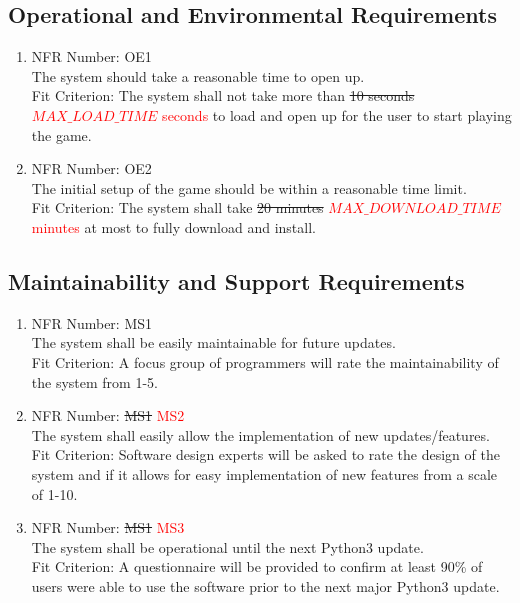 \documentclass[12pt, titlepage]{article}
\begin{document}
\subsection{Operational and Environmental Requirements}
\begin{enumerate} %
    \item NFR Number: OE1\\
    The system should take a reasonable time to open up.\\
    Fit Criterion: The system shall not take more than \sout{10 seconds} \textcolor{red}{$MAX\_LOAD\_TIME$ seconds} to load and open up for the user to start playing the game.
    \item NFR Number: OE2\\
    The initial setup of the game should be within a reasonable time limit.\\
    Fit Criterion: The system shall take \sout{20 minutes} \textcolor{red}{$MAX\_DOWNLOAD\_TIME$ minutes} at most to fully download and install.
\end{enumerate}

\subsection{Maintainability and Support Requirements}
\begin{enumerate}
    \item NFR Number: MS1\\ %
    The system shall be easily maintainable for future updates.\\
    Fit Criterion: A focus group of programmers will rate the maintainability of the system from 1-5.
    \item NFR Number: \sout{MS1} \textcolor{red}{MS2}\\ %
    The system shall easily allow the implementation of new updates/features.\\
    Fit Criterion: Software design experts will be asked to rate the design of the system and if it allows for easy implementation of new features from a scale of 1-10.
    \item NFR Number: \sout{MS1} \textcolor{red}{MS3}\\ %
    The system shall be operational until the next Python3 update.\\
    Fit Criterion: A questionnaire will be provided to confirm at least 90\% of users were able to use the software prior to the next major Python3 update.
\end{enumerate}
\end{document}

